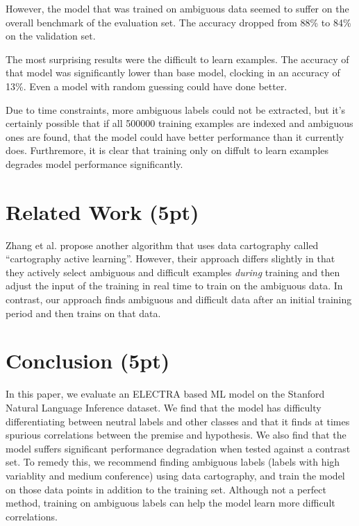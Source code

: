 \documentclass[twocolumn]{article}
\begin{document}
However, the model that was trained on ambiguous data seemed to suffer on the
overall benchmark of the evaluation set. The accuracy dropped from 88\% to 84\%
on the validation set.

The most surprising results were the difficult to learn examples. The accuracy
of that model was significantly lower than base model, clocking in an accuracy
of 13\%. Even a model with random guessing could have done better. 

Due to time constraints, more ambiguous labels could not be extracted, but it's
certainly possible that if all 500000 training examples are indexed and
ambiguous ones are found, that the model could have better performance than it
currently does. Furthremore, it is clear that training only on diffult to learn
examples degrades model performance significantly.

 \section{Related Work (5pt)}
Zhang et al. \cite{zhang2022cartography} propose another algorithm that uses
data cartography called \enquote{cartography active learning}. However, their
approach differs slightly in that they actively select ambiguous and difficult
examples \textit{during} training and then adjust the input of the training in
real time to train on the ambiguous data. In contrast, our approach finds
ambiguous and difficult data after an initial training period and then trains on
that data.

\section{Conclusion (5pt)}

In this paper, we evaluate an ELECTRA based ML model on the Stanford Natural
Language Inference dataset. We find that the model has difficulty
differentiating between neutral labels and other classes and that it finds at
times spurious correlations between the premise and hypothesis. We also find
that the model suffers significant performance degradation when tested against a
contrast set. To remedy this, we recommend finding ambiguous labels (labels with
high variablity and medium conference) using data cartography, and train the
model on those data points in addition to the training set. Although not a
perfect method, training on ambiguous labels can help the model learn more
difficult correlations.

{}

\end{document}
